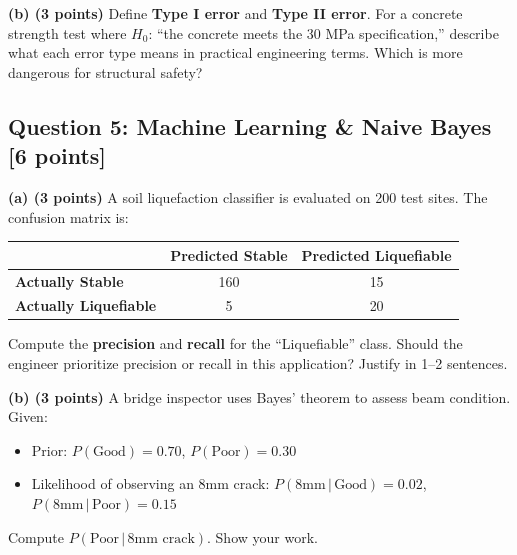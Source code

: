 \documentclass[11pt,a4paper]{article}
\begin{document}
\noindent\textbf{(b) (3 points)} Define \textbf{Type I error} and \textbf{Type II error}. For a concrete strength test where $H_0$: ``the concrete meets the 30 MPa specification,'' describe what each error type means in practical engineering terms. Which is more dangerous for structural safety?

\vspace{5.5cm}

\newpage
\subsection*{Question 5: Machine Learning \& Naive Bayes \hfill [6 points]}

\noindent\textbf{(a) (3 points)} A soil liquefaction classifier is evaluated on 200 test sites. The confusion matrix is:

\begin{center}
\begin{tabular}{l|cc}
 & \textbf{Predicted Stable} & \textbf{Predicted Liquefiable} \\
\hline
\textbf{Actually Stable} & 160 & 15 \\
\textbf{Actually Liquefiable} & 5 & 20 \\
\end{tabular}
\end{center}

Compute the \textbf{precision} and \textbf{recall} for the ``Liquefiable'' class. Should the engineer prioritize precision or recall in this application? Justify in 1--2 sentences.

\vspace{5.5cm}

\noindent\textbf{(b) (3 points)} A bridge inspector uses Bayes' theorem to assess beam condition. Given:
\begin{itemize}
\setlength\itemsep{0em}
\item Prior: $P(\text{Good}) = 0.70$, $P(\text{Poor}) = 0.30$
\item Likelihood of observing an 8mm crack: $P(\text{8mm} \,|\, \text{Good}) = 0.02$, $P(\text{8mm} \,|\, \text{Poor}) = 0.15$
\end{itemize}

\noindent Compute $P(\text{Poor} \,|\, \text{8mm crack})$. Show your work.

\vspace{6cm}

\newpage
\end{document}
